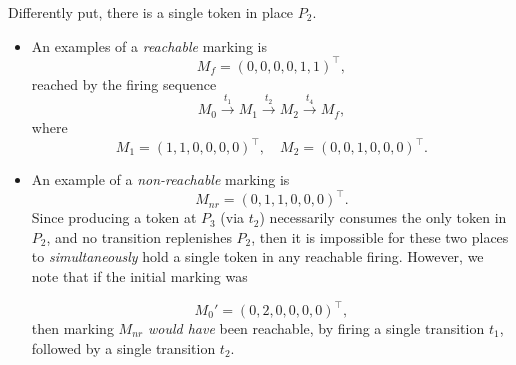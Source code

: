 Differently put, there is a single token in place $P_2$.


\begin{itemize}
	\item An examples of a \emph{reachable} marking is
	\[
	M_f = (0,0,0,0,1,1)^\top,
	\]
	reached by the firing sequence
	\[
	M_0 \xrightarrow{t_1} M_1
	\xrightarrow{t_2} M_2
	\xrightarrow{t_4} M_f,
	\]
	where
	\[
	M_1 = (1,1,0,0,0,0)^\top,
	\quad
	M_2 = (0,0,1,0,0,0)^\top.
	\]
	\item An example of a \emph{non-reachable} marking is
	\[
	M_{nr} = (0,1,1,0,0,0)^\top.
	\]
	Since producing a token at \(P_3\) (via \(t_2\)) necessarily consumes the only token in \(P_2\), and no transition replenishes \(P_2\), then it is impossible for these two places to \textit{simultaneously} hold a single token in any reachable firing. However, we note that if the initial marking was 
	
	\[
	M_0' = (0,2,0,0,0,0)^\top,
	\]
	then marking $M_{nr}$ \textit{would have} been reachable, by firing a single transition $t_1$, followed by a single transition $t_2$.
\end{itemize}






